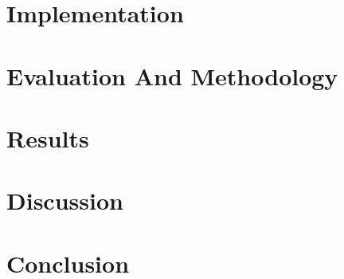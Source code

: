 \documentclass{report}
\begin{document}
\chapter{Implementation}


\chapter{Evaluation And Methodology}


\chapter{Results}


\chapter{Discussion}


\chapter{Conclusion}


\newpage

%  
% 
\end{document}
